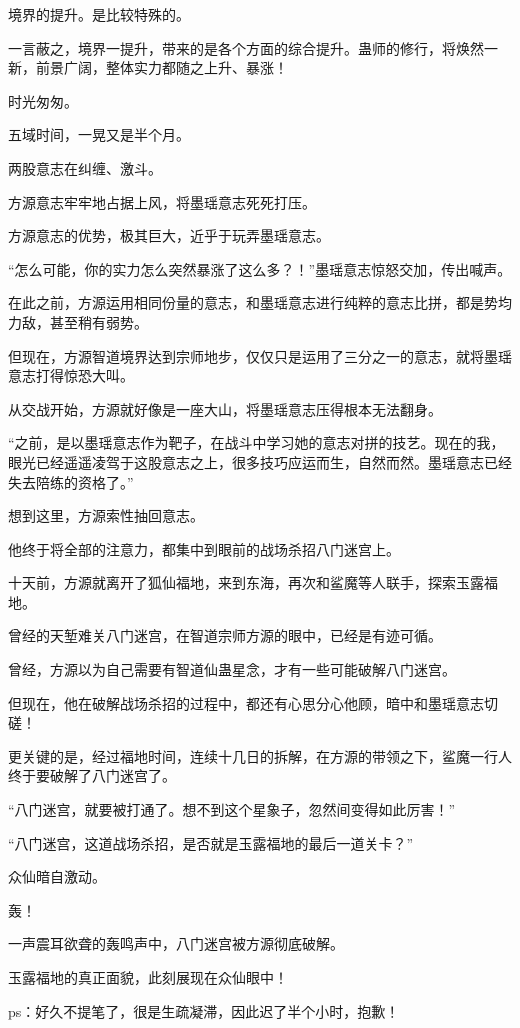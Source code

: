 \begin{this_body}
境界的提升。是比较特殊的。

一言蔽之，境界一提升，带来的是各个方面的综合提升。蛊师的修行，将焕然一新，前景广阔，整体实力都随之上升、暴涨！

时光匆匆。

五域时间，一晃又是半个月。

两股意志在纠缠、激斗。

方源意志牢牢地占据上风，将墨瑶意志死死打压。

方源意志的优势，极其巨大，近乎于玩弄墨瑶意志。

“怎么可能，你的实力怎么突然暴涨了这么多？！”墨瑶意志惊怒交加，传出喊声。

在此之前，方源运用相同份量的意志，和墨瑶意志进行纯粹的意志比拼，都是势均力敌，甚至稍有弱势。

但现在，方源智道境界达到宗师地步，仅仅只是运用了三分之一的意志，就将墨瑶意志打得惊恐大叫。

从交战开始，方源就好像是一座大山，将墨瑶意志压得根本无法翻身。

“之前，是以墨瑶意志作为靶子，在战斗中学习她的意志对拼的技艺。现在的我，眼光已经遥遥凌驾于这股意志之上，很多技巧应运而生，自然而然。墨瑶意志已经失去陪练的资格了。”

想到这里，方源索性抽回意志。

他终于将全部的注意力，都集中到眼前的战场杀招八门迷宫上。

十天前，方源就离开了狐仙福地，来到东海，再次和鲨魔等人联手，探索玉露福地。

曾经的天堑难关八门迷宫，在智道宗师方源的眼中，已经是有迹可循。

曾经，方源以为自己需要有智道仙蛊星念，才有一些可能破解八门迷宫。

但现在，他在破解战场杀招的过程中，都还有心思分心他顾，暗中和墨瑶意志切磋！

更关键的是，经过福地时间，连续十几日的拆解，在方源的带领之下，鲨魔一行人终于要破解了八门迷宫了。

“八门迷宫，就要被打通了。想不到这个星象子，忽然间变得如此厉害！”

“八门迷宫，这道战场杀招，是否就是玉露福地的最后一道关卡？”

众仙暗自激动。

轰！

一声震耳欲聋的轰鸣声中，八门迷宫被方源彻底破解。

玉露福地的真正面貌，此刻展现在众仙眼中！

ps：好久不提笔了，很是生疏凝滞，因此迟了半个小时，抱歉！


\end{this_body}
